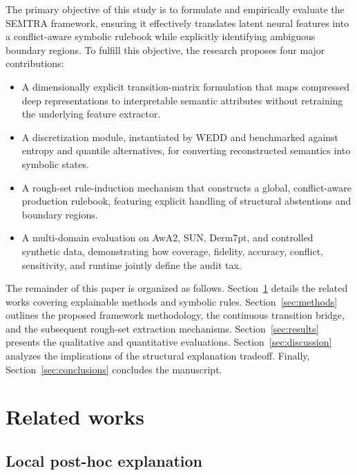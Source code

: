 \documentclass[make,article,submit,pdftex,moreauthors]{Definitions/mdpi}
\begin{document}
The primary objective of this study is to formulate and empirically evaluate the SEMTRA framework, ensuring it effectively translates latent neural features into a conflict-aware symbolic rulebook while explicitly identifying ambiguous boundary regions. To fulfill this objective, the research proposes four major contributions:
\begin{itemize}
    \item A dimensionally explicit transition-matrix formulation that maps compressed deep representations to interpretable semantic attributes without retraining the underlying feature extractor.
    \item A discretization module, instantiated by WEDD and benchmarked against entropy and quantile alternatives, for converting reconstructed semantics into symbolic states.
    \item A rough-set rule-induction mechanism that constructs a global, conflict-aware production rulebook, featuring explicit handling of structural abstentions and boundary regions.
    \item A multi-domain evaluation on AwA2, SUN, Derm7pt, and controlled synthetic data, demonstrating how coverage, fidelity, accuracy, conflict, sensitivity, and runtime jointly define the audit tax.
\end{itemize}

The remainder of this paper is organized as follows. Section~\ref{sec:related} details the related works covering explainable methods and symbolic rules. Section~\ref{sec:methods} outlines the proposed framework methodology, the continuous transition bridge, and the subsequent rough-set extraction mechanisms. Section~\ref{sec:results} presents the qualitative and quantitative evaluations. Section~\ref{sec:discussion} analyzes the implications of the structural explanation tradeoff. Finally, Section~\ref{sec:conclusions} concludes the manuscript.

\section{Related works}
\label{sec:related}

\subsection{Local post-hoc explanation}
\label{subsec:local_explanation}
\end{document}
